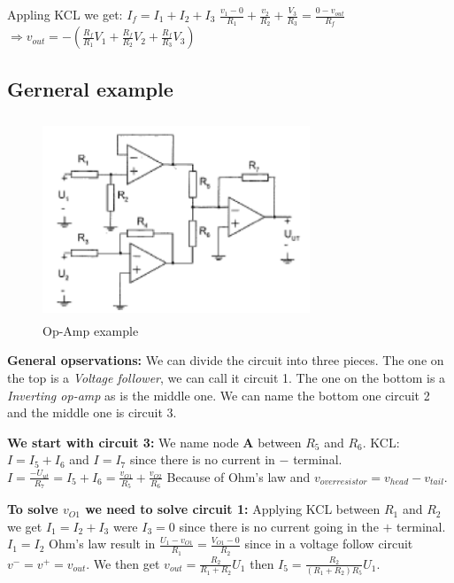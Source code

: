 Appling KCL we get: $I_f=I_1+I_2+I_3$ 
$\frac{v_1-0}{R_1} + \frac{v_2}{R_2} + \frac{V_3}{R_3} = \frac{0-v_{out}}{R_f}$
$\Rightarrow v_{out}=-(\frac{R_f}{R_1}V_1 + \frac{R_f}{R_2}V_2 + \frac{R_f}{R_3}V_3)$

\newpage
\subsection{Gerneral example}
\begin{figure}[h]
    \vspace{10mm}
    \centering
    \includegraphics[width=8cm, height=6cm]{image/op-amp-example.png}
    \caption{Op-Amp example}
\end{figure}
\textbf{General opservations:} 
We can divide the circuit into three pieces. The one on the top is a   
\textit{Voltage follower}, we can call it circuit 1. The one on the bottom
is a \textit{Inverting op-amp} as is the middle one. We can name the bottom
one circuit 2 and the middle one is circuit 3.
\vspace{3mm}

\textbf{We start with circuit 3:} \newline
We name node \textbf{A} between $R_5$ and $R_6$. KCL: $I=I_5+I_6$ and $I=I_7$ since \newline
there is no current in $-$ terminal. \newline
$I=\frac{-U_{ut}}{R_7}=I_5+I_6=\frac{v_{O1}}{R_5}+\frac{v_{O2}}{R_6}$ \newline
Because of Ohm's law and $v_{over resistor}=v_{head}-v_{tail}$. \newline
\vspace{3mm}

\textbf{To solve $v_{O1}$ we need to solve circuit 1:} \newline
Applying KCL between $R_1$ and $R_2$ we get $I_1=I_2+I_3$ were $I_3=0$ since \newline
there is no current going in the $+$ terminal. $I_1=I_2$ Ohm's law result in \newline
$\frac{U_1-v_{O1}}{R_1}=\frac{V_{O1}-0}{R_2}$ since in a voltage follow circuit \newline
$v^-=v^+=v_{out}$. We then get $v_{out}=\frac{R_2}{R_1+R_2}U_1$ \newline
then $I_5=\frac{R_2}{(R_1+R_2)R_5}U_1$. \newline
\vspace{3mm}

